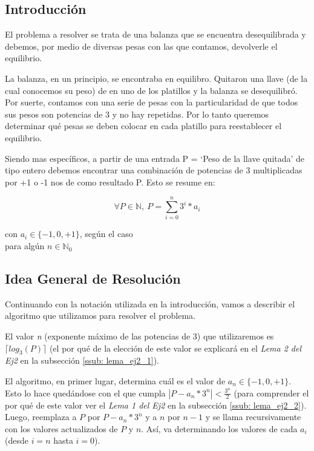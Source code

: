 \subsection{Introducción}
\par El problema a resolver se trata de una balanza que se encuentra desequilibrada y debemos, por medio de diversas pesas con las que contamos, devolverle el equilibrio.
\par La balanza, en un principio, se encontraba en equilibro. Quitaron una llave (de la cual conocemos su peso) de en uno de los platillos y la balanza se desequilibró. Por suerte, contamos con una serie de pesas con la particularidad de que todos sus pesos son potencias de 3 y no hay repetidas. Por lo tanto queremos determinar qué pesas se deben colocar en cada platillo para reestablecer el equilibrio.
\par Siendo mas específicos,  a partir de una entrada P = `Peso de la llave quitada' de tipo entero debemos encontrar una combinación de potencias de 3 multiplicadas por +1 o -1 nos de como resultado P. Esto se resume en:

\begin{equation}
	\forall P \in \mathds{N},\ P = \sum_{i = 0}^{n} 3^{i} * a_i
\end{equation}
\begin{flushright}
	con $a_i \in \{-1, 0 , +1\}$, según el caso\\
	para algún $n \in \mathds{N}_0$
\end{flushright}

\subsection{Idea General de Resolución}

\par Continuando con la notación utilizada en la introducción, vamos a describir el algoritmo que utilizamos para resolver el problema.
\par El valor \textit{n} (exponente máximo de las potencias de 3) que utilizaremos es $\lceil log_{3}(P) \rceil$ (el por qué de la elección de este valor se explicará en el \textit{Lema 2 del Ej2} en la subsección \ref{ssub: lema_ej2_1}).
\par El algoritmo, en primer lugar, determina cuál es el valor de $a_{n} \in \{-1,0,+1\}$. Esto lo hace quedándose con el que cumpla $| P - a_{n} * 3^{n} | < \frac{3^{n}}{2}$ (para comprender el por qué de este valor ver el \textit{Lema 1 del Ej2} en la subsección \ref{ssub: lema_ej2_2}). Luego, reemplaza a $P$ por $P - a_{n} * 3^{n}$ y a $n$ por $n - 1$ y se llama recursivamente con los valores actualizados de $P$ y $n$. Así, va determinando los valores de cada $a_{i}$ (desde $i=n$ hasta $i=0$).

